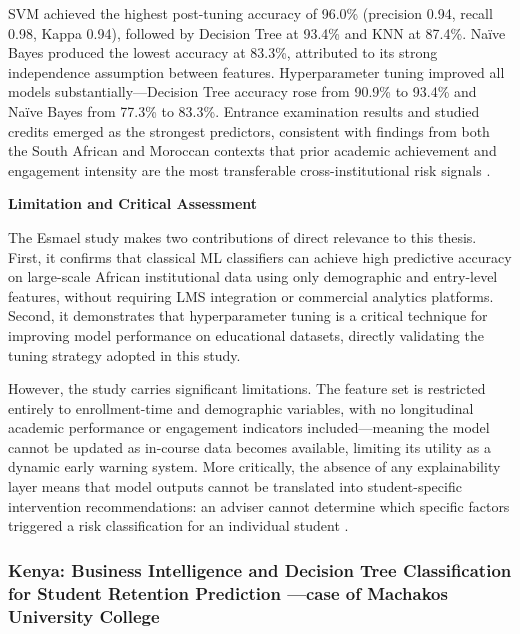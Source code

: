\documentclass[12pt]{report}
\begin{document}
SVM achieved the highest post-tuning accuracy of 96.0\% (precision 
0.94, recall 0.98, Kappa 0.94), followed by Decision Tree at 93.4\% 
and KNN at 87.4\%. Naïve Bayes produced the lowest accuracy at 83.3\%, 
attributed to its strong independence assumption between features. 
Hyperparameter tuning improved all models substantially---Decision Tree 
accuracy rose from 90.9\% to 93.4\% and Naïve Bayes from 77.3\% to 
83.3\%. Entrance examination results and studied credits emerged as the 
strongest predictors, consistent with findings from both the South 
African and Moroccan contexts that prior academic achievement and 
engagement intensity are the most transferable cross-institutional risk 
signals \parencite{esmael2024}.

\textbf{Limitation and Critical Assessment}

The Esmael study makes two contributions of direct relevance to this 
thesis. First, it confirms that classical ML classifiers can achieve 
high predictive accuracy on large-scale African institutional data 
using only demographic and entry-level features, without requiring 
LMS integration or commercial analytics platforms. Second, it 
demonstrates that hyperparameter tuning is a critical technique for 
improving model performance on educational datasets, directly 
validating the tuning strategy adopted in this study.

However, the study carries significant limitations. The feature set 
is restricted entirely to enrollment-time and demographic variables, 
with no longitudinal academic performance or engagement indicators 
included---meaning the model cannot be updated as in-course data 
becomes available, limiting its utility as a dynamic early warning 
system. More critically, the absence of any explainability layer 
means that model outputs cannot be translated into student-specific 
intervention recommendations: an adviser cannot determine which 
specific factors triggered a risk classification for an individual 
student \parencite{esmael2024}.



\subsubsection{Kenya: Business Intelligence and Decision Tree Classification for Student Retention Prediction ---case of Machakos University College}
\end{document}
